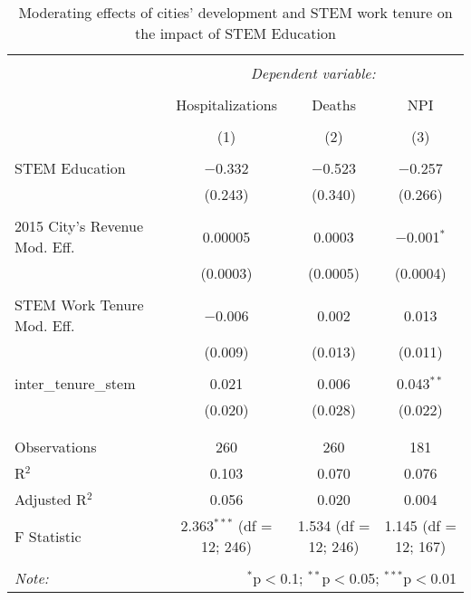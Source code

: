 
\begin{table}[!htbp] \centering 
  \caption{Moderating effects of cities’ development and STEM work tenure on the impact of STEM Education} 
  \label{} 
\begin{tabular}{@{\extracolsep{5pt}}lccc} 
\\[-1.8ex]\hline 
\hline \\[-1.8ex] 
 & \multicolumn{3}{c}{\textit{Dependent variable:}} \\ 
\cline{2-4} 
\\[-1.8ex] & Hospitalizations & Deaths & NPI \\ 
\\[-1.8ex] & (1) & (2) & (3)\\ 
\hline \\[-1.8ex] 
 STEM Education & $-$0.332 & $-$0.523 & $-$0.257 \\ 
  & (0.243) & (0.340) & (0.266) \\ 
  & & & \\ 
 2015 City's Revenue Mod. Eff. & 0.00005 & 0.0003 & $-$0.001$^{*}$ \\ 
  & (0.0003) & (0.0005) & (0.0004) \\ 
  & & & \\ 
 STEM Work Tenure Mod. Eff. & $-$0.006 & 0.002 & 0.013 \\ 
  & (0.009) & (0.013) & (0.011) \\ 
  & & & \\ 
 inter\_tenure\_stem & 0.021 & 0.006 & 0.043$^{**}$ \\ 
  & (0.020) & (0.028) & (0.022) \\ 
  & & & \\ 
\hline \\[-1.8ex] 
Observations & 260 & 260 & 181 \\ 
R$^{2}$ & 0.103 & 0.070 & 0.076 \\ 
Adjusted R$^{2}$ & 0.056 & 0.020 & 0.004 \\ 
F Statistic & 2.363$^{***}$ (df = 12; 246) & 1.534 (df = 12; 246) & 1.145 (df = 12; 167) \\ 
\hline 
\hline \\[-1.8ex] 
\textit{Note:}  & \multicolumn{3}{r}{$^{*}$p$<$0.1; $^{**}$p$<$0.05; $^{***}$p$<$0.01} \\ 
\end{tabular} 
\end{table} 
